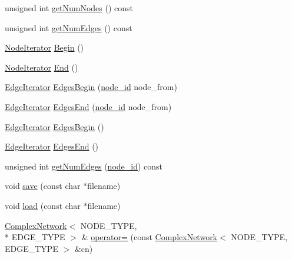 \begin{DoxyCompactItemize}
\item 
unsigned int \hyperlink{class_complex_network_afee98f26ceed674c17be01a740787170}{get\+Num\+Nodes} () const 
\item 
unsigned int \hyperlink{class_complex_network_a720cb4e40342648d394792cc693d29a5}{get\+Num\+Edges} () const 
\item 
\hyperlink{class_complex_network_1_1_node_iterator}{Node\+Iterator} \hyperlink{class_complex_network_ab02bc6912437322f146f6ce98b415759}{Begin} ()
\item 
\hyperlink{class_complex_network_1_1_node_iterator}{Node\+Iterator} \hyperlink{class_complex_network_a2c90f4efd046776d7a53776b24daae0f}{End} ()
\item 
\hyperlink{class_complex_network_1_1_edge_iterator}{Edge\+Iterator} \hyperlink{class_complex_network_a2167b224079f5c0b44443959ad0b6440}{Edges\+Begin} (\hyperlink{_complex_network_8hpp_a8323334ca788fde39682469321590d52}{node\+\_\+id} node\+\_\+from)
\item 
\hyperlink{class_complex_network_1_1_edge_iterator}{Edge\+Iterator} \hyperlink{class_complex_network_ad806138ea94ec18ed17f4681ab731208}{Edges\+End} (\hyperlink{_complex_network_8hpp_a8323334ca788fde39682469321590d52}{node\+\_\+id} node\+\_\+from)
\item 
\hyperlink{class_complex_network_1_1_edge_iterator}{Edge\+Iterator} \hyperlink{class_complex_network_a3a228b9a9497db2b9385deb4eb39f1e1}{Edges\+Begin} ()
\item 
\hyperlink{class_complex_network_1_1_edge_iterator}{Edge\+Iterator} \hyperlink{class_complex_network_afa7d628b66a815d97afbf5373640d12b}{Edges\+End} ()
\item 
unsigned int \hyperlink{class_complex_network_a4036d2cda2dc5596d03e164c3455aff6}{get\+Num\+Edges} (\hyperlink{_complex_network_8hpp_a8323334ca788fde39682469321590d52}{node\+\_\+id}) const 
\item 
void \hyperlink{class_complex_network_a5d127d4296808b7ccdadccaa58084e96}{save} (const char $\ast$filename)
\item 
void \hyperlink{class_complex_network_a54fbdb35418f424e8dad0dbc5dc16bee}{load} (const char $\ast$filename)
\item 
\hyperlink{class_complex_network}{Complex\+Network}$<$ N\+O\+D\+E\+\_\+\+T\+Y\+P\+E, \\*
E\+D\+G\+E\+\_\+\+T\+Y\+P\+E $>$ \& \hyperlink{class_complex_network_a5a8b07f5ca5d247e13a2e2bc5ac75de1}{operator=} (const \hyperlink{class_complex_network}{Complex\+Network}$<$ N\+O\+D\+E\+\_\+\+T\+Y\+P\+E, E\+D\+G\+E\+\_\+\+T\+Y\+P\+E $>$ \&cn)
\end{DoxyCompactItemize}
